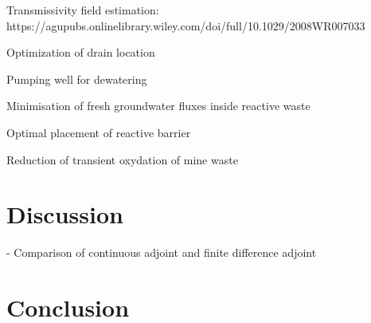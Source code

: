 \documentclass[11pt]{article}
\begin{document}
Transmissivity field estimation: https://agupubs.onlinelibrary.wiley.com/doi/full/10.1029/2008WR007033

Optimization of drain location

Pumping well for dewatering

Minimisation of fresh groundwater fluxes inside reactive waste

Optimal placement of reactive barrier

Reduction of transient oxydation of mine waste



\section{Discussion}
-
Comparison of continuous adjoint and finite difference adjoint %


\section{Conclusion}
\end{document}
